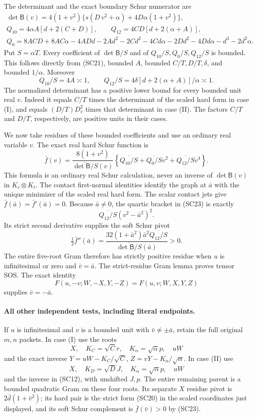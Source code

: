 The determinant and the exact boundary Schur numerator are
\[
\begin{gathered}
 \det\mathsf B(v)=4(1+v^2)\{s(D\,v^2+\alpha)+4D\alpha(1+v^2)\},\\
 Q_{10}=4\alpha A[d+2(C+D)],\qquad
 Q_{12}=4CD[d+2(\alpha+A)],\\
 Q_0=8ACD+8AC\alpha-4ADd-2Ad^2-2Cd^2-4Cd\alpha
       -2Dd^2-4Dd\alpha-d^3-2d^2\alpha.             
\end{gathered}
\tag{SC21}
\]
Put $S=\alpha T$. Every coefficient of $\det\mathsf B/S$ and of
$Q_{10}/S,Q_0/S,Q_{12}/S$ is bounded. This follows directly from
(SC21), bounded $A$, bounded $C/T,D/T,\delta$, and bounded
$1/\alpha$. Moreover
\[
 Q_{10}/S=4A\asymp1,\qquad
 Q_{12}/S=4\delta[d+2(\alpha+A)]/\alpha\asymp1.       \tag{SC22}
\]
The normalized determinant has a positive lower bound for every
bounded unit real $v$. Indeed it equals $C/T$ times the determinant
of the scaled hard form in case (I), and equals
$(D/T)D_v^2$ times that determinant in case (II). The factors
$C/T$ and $D/T$, respectively, are positive units in their cases.

We now take residues of these bounded coefficients and use an
ordinary real variable $v$. The exact real hard Schur function is
\[
 \bar f(v)=
 \frac{8(1+v^2)}{\overline{\det\mathsf B/S}(v)}
 \left\{\overline{Q_{10}/S}+\overline{Q_0/S}v^2
                      +\overline{Q_{12}/S}v^4\right\}.          \tag{SC23}
\]
This formula is an ordinary real Schur calculation, never an
inverse of $\det\mathsf B(v)$ in $K_c\otimes K_t$.
The contact first-normal identities identify the graph at $\bar a$
with the unique minimizer of the scaled real hard form. The scalar
contact jets give $\bar f(\bar a)=\bar f'(\bar a)=0$.
Because $\bar a\ne0$, the quartic bracket in (SC23) is exactly
\[
 \overline{Q_{12}/S}(v^2-\bar a^2)^2.
\]
Its strict second derivative supplies the soft Schur pivot
\[
 \tfrac12\bar f''(\bar a)=
 \frac{32(1+\bar a^2)\bar a^2\overline{Q_{12}/S}}
      {\overline{\det\mathsf B/S}(\bar a)}>0.
\]
The entire five-root Gram therefore has strictly positive residue
when $u$ is infinitesimal or zero and $\bar v=\bar a$.
The strict-residue Gram lemma proves tensor SOS. The exact identity
\[
 F(u,-v;W,-X,Y,-Z)=F(u,v;W,X,Y,Z)
\]
supplies $\bar v=-\bar a$.

\paragraph{All other independent tests, including literal endpoints.}
If $u$ is infinitesimal and $v$ is a bounded unit with
$\bar v\ne\pm\bar a$, retain the full original $m,n$ packets.
In case (I) use the roots
\[
 X,\quad K_C=\sqrt C r,\quad K_\alpha=\sqrt\alpha p,\quad uW
\]
and the exact inverse
$Y=uW-K_C/\sqrt C$, $Z=vY-K_\alpha/\sqrt\alpha$.
In case (II) use
\[
 X,\quad K_D=\sqrt D J,\quad K_\alpha=\sqrt\alpha p,\quad uW
\]
and the inverse in (SC12), with unshifted $J,p$.
The entire remaining parent is a bounded quadratic Gram on these
four roots. Its separate $X$ residue pivot is
$2\bar d(1+\bar v^2)$; its hard pair is the strict form (SC20)
in the scaled coordinates just displayed, and its soft Schur
complement is $\bar f(\bar v)>0$ by (SC23).

